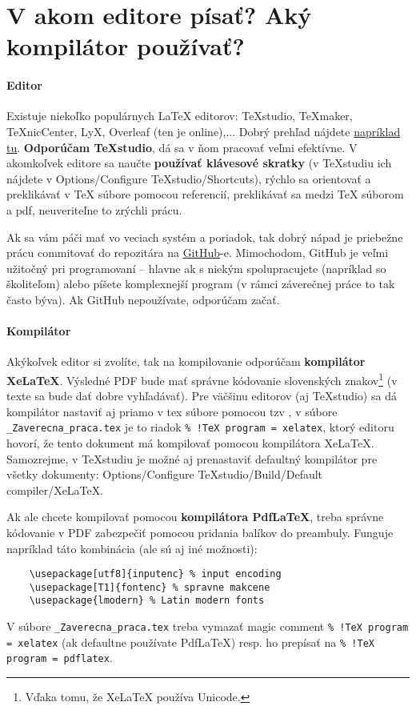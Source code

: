 \chapter{V akom editore písať? Aký kompilátor používať?}\label{sec:aky_editor}

\subsubsection{Editor}
Existuje niekoľko populárnych LaTeX editorov: TeXstudio, TeXmaker, TeXnicCenter, LyX, Overleaf (ten je online),... Dobrý prehľad nájdete \href{https://beebom.com/best-latex-editors/}{napríklad tu}. \textbf{Odporúčam TeXstudio}, dá sa v ňom pracovať veľmi efektívne. V akomkoľvek editore sa naučte \textbf{používať klávesové skratky} (v TeXstudiu ich nájdete v Options/Configure TeXstudio/Shortcuts), rýchlo sa orientovať a preklikávať v TeX súbore pomocou referencií, preklikávať sa medzi TeX súborom a pdf, neuveriteľne to zrýchli prácu.

Ak sa vám páči mať vo veciach systém a poriadok, tak dobrý nápad je priebežne prácu commitovať do repozitára na \href{https://github.com/}{GitHub}-e. Mimochodom, GitHub je veľmi užitočný pri programovaní -- hlavne ak s niekým spolupracujete (napríklad so školiteľom) alebo píšete komplexnejší program (v rámci záverečnej práce to tak často býva). Ak GitHub nepoužívate, odporúčam začať.

\subsubsection{Kompilátor}
Akýkoľvek editor si zvolíte, tak na kompilovanie odporúčam \textbf{kompilátor XeLaTeX}. Výsledné PDF bude mať správne kódovanie slovenských znakov\footnote{Vďaka tomu, že XeLaTeX používa Unicode.} (v texte sa bude dať dobre vyhľadávať). Pre väčšinu editorov (aj TeXstudio) sa dá kompilátor nastaviť aj priamo v tex súbore pomocou tzv , v súbore \verb|_Zaverecna_praca.tex| je to riadok \verb|% !TeX program = xelatex|, ktorý editoru hovorí, že tento dokument má kompilovať pomocou kompilátora XeLaTeX. Samozrejme, v TeXstudiu je možné aj prenastaviť defaultný kompilátor pre všetky dokumenty: Options/Configure TeXstudio/Build/Default compiler/XeLaTeX.

Ak ale chcete kompilovať pomocou \textbf{kompilátora PdfLaTeX}, treba správne kódovanie v PDF zabezpečiť pomocou pridania balíkov do preambuly. Funguje napríklad táto kombinácia (ale sú aj iné možnosti):
\begin{verbatim}
	\usepackage[utf8]{inputenc} % input encoding
	\usepackage[T1]{fontenc} % spravne makcene
	\usepackage{lmodern} % Latin modern fonts
\end{verbatim}
V súbore \verb|_Zaverecna_praca.tex| treba vymazať magic comment \verb|% !TeX program = xelatex| (ak defaultne používate PdfLaTeX) resp. ho prepísať na \verb|% !TeX program = pdflatex|.

